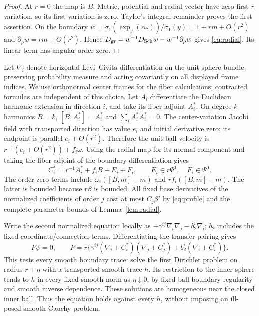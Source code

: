 \documentclass[11pt]{article}
\theoremstyle{definition}\newtheorem{definition}[theorem]{Definition}
\theoremstyle{remark}\newtheorem{remark}[theorem]{Remark}
\begin{document}
\begin{proof}
At $r=0$ the map is $B$. Metric, potential and radial vector have zero
first $r$ variation, so its first variation is zero. Taylor's integral
remainder proves the first assertion. On the boundary
$w=\sigma_1(\exp_y(r\omega))/\sigma_1(y)=1+rm+O(r^2)$ and
$\partial_\rho w=rm+O(r^2)$. Hence
$D_{\rm gr}=w^{-1}D_{\rm Sch}w-w^{-1}\partial_\rho w$ gives
\eqref{eq:radial}. Its linear term has angular order zero.
\end{proof}

Let $\nabla_i$ denote horizontal Levi--Civita differentiation on the unit
sphere bundle, preserving probability measure and acting covariantly on
all displayed frame indices. We use orthonormal center frames for the
fiber calculations; contracted formulas are independent of this choice. Let $A_i$ differentiate
the Euclidean harmonic extension in direction $i$, and take its fiber
adjoint $A_i^*$. On degree-$k$ harmonics $B=k$,
$[B,A_i^*]=A_i^*$ and $\sum_iA_i^*A_i^*=0$.
The center-variation Jacobi field with transported direction has value
$e_i$ and initial derivative zero; its endpoint is parallel $e_i+O(r^2)$.
Therefore the unit-ball velocity is $r^{-1}(e_i+O(r^2))+f_i\omega$.
Using the radial map for its normal component and taking the fiber adjoint
of the boundary differentiation gives
\begin{equation}\label{eq:center}
 C_i^*=r^{-1}A_i^*+f_iB+E_i+F_i,\qquad E_i\in r\Psi^1,\quad F_i\in\Psi^0.
\end{equation}
The order-zero terms include $\omega_i([B,m]-m)$ and
$rf_i([B,m]-m)$. The latter is bounded because $r\beta$ is bounded.
All fixed base derivatives of the normalized coefficients of order $j$
cost at most $C_j\beta^j$ by \eqref{eq:profile} and the complete parameter
bounds of Lemma~\ref{lem:radial}.

Write the second normalized equation locally as
$-\gamma^{ij}\nabla_i\nabla_j-b_2^i\nabla_i$; $b_2$ includes the fixed
coordinate/connection terms. Differentiating the transfer pairing gives
\begin{equation}\label{eq:Pequation}
 P\psi=0,\qquad
 P=r\{\gamma^{ij}(\nabla_i+C_i^*)(\nabla_j+C_j^*)
                         +b_2^i(\nabla_i+C_i^*)\}.
\end{equation}
This tests every smooth boundary trace: solve the first Dirichlet problem
on radius $r+\eta$ with a transported smooth trace $h$.
Its restriction to the inner sphere tends to $h$ in every fixed smooth
norm as $\eta\downarrow0$, by fixed-ball boundary regularity and smooth
inverse dependence. These solutions are homogeneous near the closed
inner ball. Thus the equation holds against every $h$, without imposing
an ill-posed smooth Cauchy problem.
\end{document}
